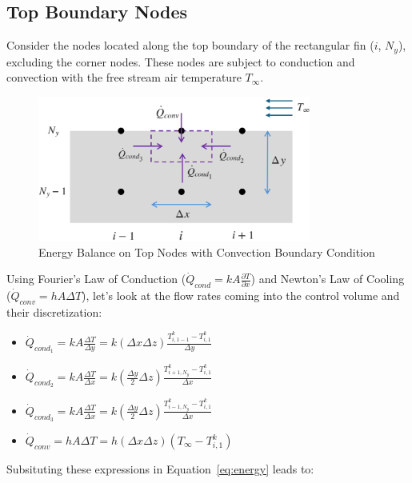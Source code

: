 \documentclass{article}
\newcommand{\pderiv}[2]{\displaystyle \frac{\partial #1}{\partial #2}}
\newcommand{\ddfrac}[2]{\frac{\displaystyle #1}{\displaystyle #2}}
\begin{document}
\subsection{Top Boundary Nodes}

Consider the nodes located along the top boundary of the rectangular fin ($i$, $N_y$), excluding the corner nodes. These nodes are subject to conduction and convection with the free stream air temperature $T_{\infty}$.\\

\begin{figure}[h]
    \centering
    \includegraphics[width=0.8\textwidth]{fig/energyTop.png}
    \caption{Energy Balance on Top Nodes with Convection Boundary Condition}
    \label{fig:energyTop}
\end{figure}

Using Fourier's Law of Conduction ($\dot{Q}_{cond} = kA\pderiv{T}{x}$) and Newton's Law of Cooling ($\dot{Q}_{conv} = hA\Delta T$), let's look at the flow rates coming into the control volume and their discretization:

\begin{itemize}
    \item $\dot{Q}_{cond_{1}} = kA\ddfrac{\Delta T}{\Delta y} = k(\Delta x \Delta z) \ddfrac{T_{i,1-1}^k - T_{i,1}^k}{\Delta y}$
    \item $\dot{Q}_{cond_{2}} = kA\ddfrac{\Delta T}{\Delta x} = k(\ddfrac{\Delta y}{2} \Delta z) \ddfrac{T_{i+1,N_y}^k - T_{i,1}^k}{\Delta x}$
    \item $\dot{Q}_{cond_{3}} = kA\ddfrac{\Delta T}{\Delta x} = k(\ddfrac{\Delta y}{2} \Delta z) \ddfrac{T_{i-1,N_y}^k - T_{i,1}^k}{\Delta x}$
    \item $\dot{Q}_{conv} = hA\Delta T = h(\Delta x \Delta z)\left(T_{\infty} - T_{i,1}^k\right)$
\end{itemize}

Subsituting these expressions in Equation~\eqref{eq:energy} leads to:
\end{document}
